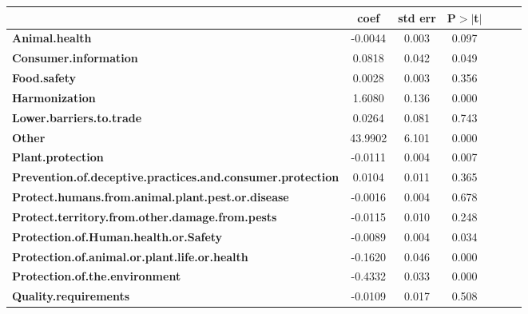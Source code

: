 \begin{table}[ht]
\begin{center}
        
        \begin{tabular}{lcccccc}
            & \textbf{coef} & \textbf{std err} &\textbf{P$> |$t$|$}\\
\midrule
\textbf{Animal.health}                                             &      -0.0044  &        0.003     &        0.097       \\
\textbf{Consumer.information}                                      &       0.0818  &        0.042     &        0.049       \\
\textbf{Food.safety}                                               &       0.0028  &        0.003     &        0.356       \\
\textbf{Harmonization}                                             &       1.6080  &        0.136     &        0.000       \\
\textbf{Lower.barriers.to.trade}                                   &       0.0264  &        0.081     &        0.743       \\
\textbf{Other}                                                     &      43.9902  &        6.101     &        0.000       \\
\textbf{Plant.protection}                                          &      -0.0111  &        0.004     &        0.007       \\
\textbf{Prevention.of.deceptive.practices.and.consumer.protection} &       0.0104  &        0.011     &        0.365       \\
\textbf{Protect.humans.from.animal.plant.pest.or.disease}          &      -0.0016  &        0.004     &        0.678       \\
\textbf{Protect.territory.from.other.damage.from.pests}            &      -0.0115  &        0.010     &        0.248       \\
\textbf{Protection.of.Human.health.or.Safety}                      &      -0.0089  &        0.004     &        0.034       \\
\textbf{Protection.of.animal.or.plant.life.or.health}              &      -0.1620  &        0.046     &        0.000       \\
\textbf{Protection.of.the.environment}                             &      -0.4332  &        0.033     &        0.000       \\
\textbf{Quality.requirements}                                      &      -0.0109  &        0.017     &        0.508       \\

\end{tabular}
\end{center}
\end{table}
